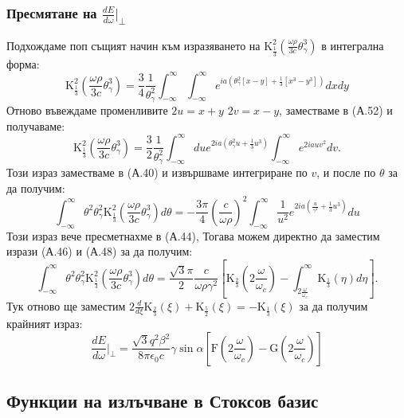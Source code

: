 \begin{appendices}
\subsubsection{Пресмятане на $\frac{dE}{d\omega}\big\vert_\perp$}
Подхождаме поп същият начин към изразяването на  $\text{K}^2_{\frac{1}{3}}\left(\frac{\omega\rho}{3 c}\theta_\gamma^3\right)$ в интегрална форма:
\begin{equation}
	\text{K}^2_{\frac{1}{3}}\left(\frac{\omega\rho}{3 c}\theta_\gamma^3\right) = 	\frac{3}{4}\frac{1}{\theta_\gamma^2}\int_{-\infty}^\infty \int_{-\infty}^\infty e^{ia\left(\theta_\gamma^2[x - y] + \frac{1}{3}[x^3 - y^3]\right)}dxdy
\end{equation}
Отново въвеждаме променливите $2u = x + y$ $2v = x - y$, заместваме в (А.52) и получаваме:
\begin{equation}
	\text{K}^2_{\frac{1}{3}}\left(\frac{\omega\rho}{3 c}\theta_\gamma^3\right) = 	\frac{3}{2}\frac{1}{\theta_\gamma^2}\int_{-\infty}^\infty du e^{2ia\left(\theta_\gamma^2 u + \frac{1}{3}u^3\right)}\int_{-\infty}^{\infty}e^{2iauv^2}dv.
\end{equation}
Този израз заместваме в (А.40) и извършваме интегриране по $v$, и после по $\theta$ за да получим:
\begin{equation}
	\int_{-\infty}^\infty \theta^2\theta_\gamma^2 \text{K}^2_{\frac{1}{3}}\left(\frac{\omega\rho}{3 c}\theta_\gamma^3\right)d\theta = -\frac{3\pi}{4}\left(\frac{c}{\omega\rho}\right)^2\int_{-\infty}^{\infty}\frac{1}{u^2} e^{2ia\left(\frac{u}{\gamma^2}+\frac{1}{3}u^3\right)}du
\end{equation}
Този израз вече пресметнахме в (А.44), Тогава можем директно да заместим изрази (А.46) и (А.48) за да получим:
\begin{equation}
	\int_{-\infty}^\infty \theta^2\theta_\gamma^2 \text{K}^2_{\frac{1}{3}}\left(\frac{\omega\rho}{3 c}\theta_\gamma^3\right)d\theta = \frac{\sqrt{3}\pi}{2}\frac{c}{\omega\rho \gamma^2}\left[\text{K}_{\frac{2}{3}}\left(2\frac{\omega}{\omega_c}\right) - \int_{2\frac{\omega}{\omega_c}}^\infty \text{K}_{\frac{1}{3}}(\eta)d\eta\right].
\end{equation}
Тук отново ще заместим $2\frac{d}{d\xi}\text{K}_{\frac{2}{3}}(\xi) + \text{K}_{\frac{5}{2}}(\xi) = - \text{K}_{\frac{1}{3}}(\xi)$ за да получим крайният израз:
\begin{equation}
	\boxed{\frac{dE}{d\omega}\bigg\vert_\perp = \frac{\sqrt{3}q^2\beta^2}{8\pi\epsilon_0 c}\gamma\sin\alpha\left[\text{F}\left(2\frac{\omega}{\omega_c}\right) - \text{G}\left(2\frac{\omega}{\omega_c}\right)\right]}
\end{equation}
\subsection{Функции на излъчване в Стоксов базис}

\newpage

\end{appendices}
